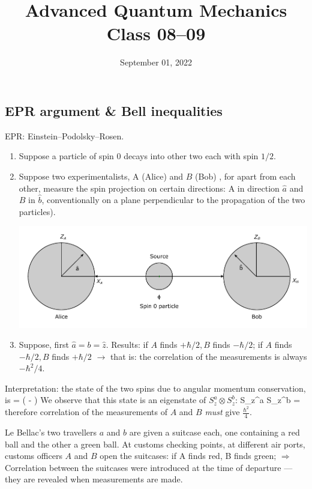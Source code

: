\documentclass[12pt]{article}
\title{Advanced Quantum Mechanics\\Class 08--09}
\date{September 01, 2022}                                           %
\begin{document}
\maketitle


\subsection{EPR argument \& Bell inequalities}

EPR: Einstein--Podolsky--Rosen.

\begin{enumerate}
\item Suppose a particle of spin 0 decays into other two
each with spin \(1 / 2\).
%
\item Suppose two experimentalists, A (Alice) and \(B\) (Bob) ,
for apart from each other, measure the spin projection
on certain directions: A in direction \(\hat{a}\) and \(B\) in \(\hat{b}\),
conventionally on a plane perpendicular to the
propagation of the two particles).
%
\begin{center}
\includegraphics[width=\textwidth]{Figures/EPR_illustration.pdf}
\end{center}
\item  Suppose, first \(\hat{a}=b=\hat{z}\). Results: if \(A\) finds
\(+\hbar / 2, B\) finds \(-\hbar / 2\); if \(A\) finds \(-\hbar / 2, B\) finds \(+\hbar / 2\)
$\rightarrow$
that is: the correlation of the measurements
is always \(-\hbar^{2} / 4\).
\end{enumerate}
Interpretation: the state of the two spins due to
angular momentum conservation, is
\be
\ket{\Phi} = 
\left(\ket{-+} - \ket{+-}\right)
\ee
We observe that this state is an eigenstate of
$S_{z}^{a} \otimes S_{z}^{b}$:
\be
S_{z}^{a} \otimes S_{z}^{b}\ket{\Phi} =  \ket{\Phi}
\ee
therefore correlation  of the measurements of $A$ and $B$
\emph{must} give $\frac{\hbar^2}{4}$.

Le Bellac's two travellers \(a\) and \(b\) are given a
suitcase each, one containing a red ball and
the other a green ball. At customs checking points,
at different air ports, customs officers \(A\) and \(B\)
open the suitcases: if A finds red, B finds green;
$\Rightarrow$
Correlation between the suitcases were
introduced at the time of departure
--- they are revealed when measurements
are made.
\end{document}
